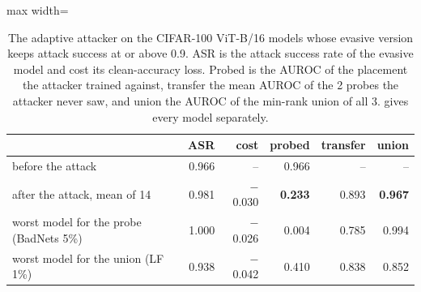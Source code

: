 \begin{table}[htbp]
\centering
\small
\caption{The adaptive attacker on the CIFAR-100 ViT-B/16 models whose evasive version keeps attack success at or above 0.9. ASR is the attack success rate of the evasive model and cost its clean-accuracy loss. Probed is the AUROC of the placement the attacker trained against, transfer the mean AUROC of the 2 probes the attacker never saw, and union the AUROC of the min-rank union of all 3.  gives every model separately.}
\label{tab:adaptive}
\begin{adjustbox}{max width=\linewidth}
\begin{tabular}{lrrrrr}
\toprule
 & ASR & cost & probed & transfer & union \\
\midrule
before the attack & 0.966 & -- & 0.966 & -- & -- \\
after the attack, mean of 14 & 0.981 & $-$0.030 & \textbf{0.233} & 0.893 & \textbf{0.967} \\
worst model for the probe (BadNets 5\%) & 1.000 & $-$0.026 & 0.004 & 0.785 & 0.994 \\
worst model for the union (LF 1\%) & 0.938 & $-$0.042 & 0.410 & 0.838 & 0.852 \\
\bottomrule
\end{tabular}
\end{adjustbox}
\end{table}
